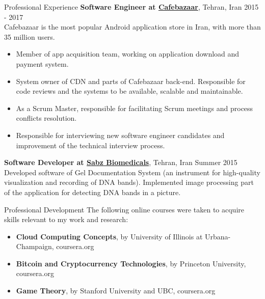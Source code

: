 \documentclass{resume} %
\begin{document}
\begin{rSection}{Professional Experience}
	{\bf Software Engineer at \href{https://cafebazaar.ir/}{Cafebazaar}}, Tehran, Iran \hfill 2015 - 2017
	\\ Cafebazaar is the most popular Android application store in Iran, with more than 35 million users.
	\begin{itemize}
		\item Member of app acquisition team, working on application download and payment system.
		\item System owner of CDN and parts of Cafebazaar back-end. Responsible for code reviews and the systems to be available, scalable and maintainable.
		\item As a Scrum Master, responsible for facilitating Scrum meetings and process conflicts resolution.
		\item Responsible for interviewing new software engineer candidates and improvement of the technical interview process.
	\end{itemize}
	
	{\bf Software Developer at \href{http://www.sabzgroup.com/}{Sabz Biomedicals}}, Tehran, Iran \hfill Summer 2015
	\\Developed software of Gel Documentation System (an instrument for high-quality visualization and recording of DNA bands). Implemented image processing part of the application for detecting DNA bands in a picture.
\end{rSection}


\begin{rSection}{Professional Development}
	The following online courses were taken to acquire skills relevant to my work and research:
	\begin{itemize}
		\item {\bf Cloud Computing Concepts}, by University of Illinois at Urbana-Champaign, coursera.org
		\item {\bf Bitcoin and Cryptocurrency Technologies}, by Princeton University, coursera.org
		\item {\bf Game Theory}, by Stanford University and UBC, coursera.org
	\end{itemize}
\end{rSection}
\end{document}
